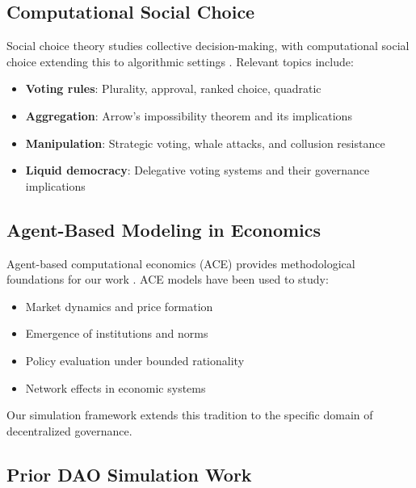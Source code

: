\subsection{Computational Social Choice}

Social choice theory studies collective decision-making, with computational social choice extending this to algorithmic settings \citep{brandt2016handbook}. Relevant topics include:

\begin{itemize}
    \item \textbf{Voting rules}: Plurality, approval, ranked choice, quadratic \citep{weyl2018quadratic, lalley2018quadratic, buterin2019flexible, daian2024quadratic}
    \item \textbf{Aggregation}: Arrow's impossibility theorem and its implications \citep{arrow1950difficulty}
    \item \textbf{Manipulation}: Strategic voting, whale attacks, and collusion resistance \citep{barbereau2024whale}
    \item \textbf{Liquid democracy}: Delegative voting systems and their governance implications \citep{hardt2023liquid, sharma2024delegated}
\end{itemize}

\subsection{Agent-Based Modeling in Economics}

Agent-based computational economics (ACE) provides methodological foundations for our work \citep{tesfatsion2006handbook}. ACE models have been used to study:

\begin{itemize}
    \item Market dynamics and price formation
    \item Emergence of institutions and norms
    \item Policy evaluation under bounded rationality
    \item Network effects in economic systems
\end{itemize}

Our simulation framework extends this tradition to the specific domain of decentralized governance.

\subsection{Prior DAO Simulation Work}

